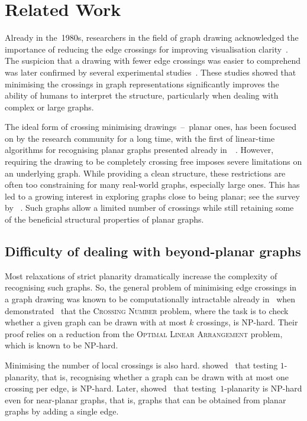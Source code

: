 \chapter{Related Work}\label{ch:related-work}

Already in the~1980s, researchers in the field of graph drawing acknowledged the importance of reducing the edge crossings for improving visualisation clarity~\cite{early-few-crossing}. The suspicion that a drawing with fewer edge crossings was easier to comprehend was later confirmed by several experimental studies~\cite{graph-aesthetic-survey}. These studies showed that minimising the crossings in graph representations significantly improves the ability of humans to interpret the structure, particularly when dealing with complex or large graphs.

The ideal form of crossing minimising drawings~--~planar ones, has been focused on by the research community for a long time, with the first of linear-time algorithms for recognising planar graphs presented already in~\citeyear{linear-p}~\cite{linear-p}. However, requiring the drawing to be completely crossing free imposes severe limitations on an underlying graph. While providing a clean structure, these restrictions are often too constraining for many real-world graphs, especially large ones. This has led to a growing interest in exploring graphs close to being planar; see the survey by \citeauthor{beyond-planarity-survey}~\cite{beyond-planarity-survey}. Such graphs allow a limited number of crossings while still retaining some of the beneficial structural properties of planar graphs.


\section{Difficulty of dealing with beyond-planar graphs}

Most relaxations of strict planarity dramatically increase the complexity of recognising such graphs. So, the general problem of minimising edge crossings in a graph drawing was known to be computationally intractable already in~\citeyear{cr_NPC} when \citeauthor{cr_NPC} demonstrated~\cite{cr_NPC} that the \textsc{Crossing Number} problem, where the task is to check whether a given graph can be drawn with at most \(k\) crossings, is NP-hard. Their proof relies on a reduction from the \textsc{Optimal Linear Arrangement} problem, which is known to be NP-hard.

Minimising the number of local crossings is also hard. \citeauthor{1p-NPH} showed~\cite{1p-NPH} that testing \(1\)-planarity, that is, recognising whether a graph can be drawn with at most one crossing per edge, is NP-hard. Later, \citeauthor{one-edge-NPH} showed~\cite{one-edge-NPH} that testing~\(1\)-planarity is NP-hard even for near-planar graphs, that is, graphs that can be obtained from planar graphs by adding a single edge.

